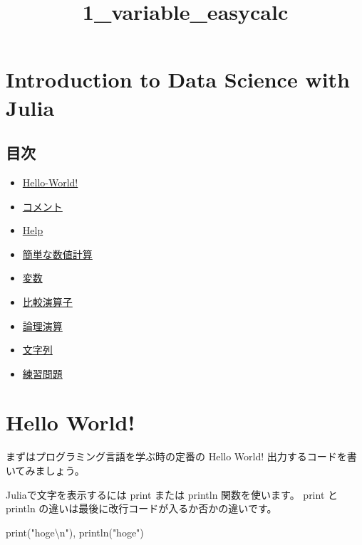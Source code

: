 \documentclass[a4paper,dvipdfmx,uplatex]{jsarticle}
\title{1\_variable\_easycalc}
\providecommand{\tightlist}{%
      \setlength{\itemsep}{0pt}\setlength{\parskip}{0pt}}
\newenvironment{Shaded}{}{}
\newcommand{\StringTok}[1]{\textcolor[rgb]{0.25,0.44,0.63}{{#1}}}
\newcommand{\NormalTok}[1]{{#1}}
\begin{document}
    
    
    \maketitle
    
    

    
    \section{Introduction to Data Science with
Julia}\label{introduction-to-data-science-with-julia}

\subsection{目次}\label{ux76eeux6b21}

\begin{itemize}
\tightlist
\item
  \protect\hyperlink{Hello-Worldux21}{Hello-World!}
\item
  \protect\hyperlink{ux30b3ux30e1ux30f3ux30c8}{コメント}
\item
  \protect\hyperlink{Help}{Help}
\item
  \protect\hyperlink{ux7c21ux5358ux306aux6570ux5024ux8a08ux7b97}{簡単な数値計算}
\item
  \protect\hyperlink{ux5909ux6570}{変数}
\item
  \protect\hyperlink{ux6bd4ux8f03ux6f14ux7b97ux5b50}{比較演算子}
\item
  \protect\hyperlink{ux8ad6ux7406ux6f14ux7b97}{論理演算}
\item
  \protect\hyperlink{ux6587ux5b57ux5217}{文字列}
\item
  \protect\hyperlink{ux7df4ux7fd2ux554fux984c}{練習問題}
\end{itemize}

    \section{Hello World!}\label{hello-world}

まずはプログラミング言語を学ぶ時の定番の Hello World!
出力するコードを書いてみましょう。

Juliaで文字を表示するには print または println 関数を使います。 print と
println の違いは最後に改行コードが入るか否かの違いです。

\begin{Shaded}
\begin{Highlighting}[]
    \NormalTok{print(}\StringTok{"hoge}\NormalTok{\textbackslash{}n}\StringTok{"}\NormalTok{), println(}\StringTok{"hoge"}\NormalTok{)}
\end{Highlighting}
\end{Shaded}
\end{document}
